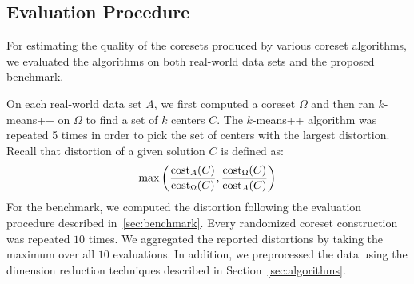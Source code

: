 \subsection{Evaluation Procedure}
For estimating the quality of the coresets produced by various coreset algorithms, we evaluated the algorithms on both real-world data sets and the proposed benchmark. 

On each real-world data set $A$, we first computed a coreset $\Omega$ and then ran $k$-means++ on $\Omega$ to find a set of $k$ centers $C$. The $k$-means++ algorithm was repeated 5 times in order to pick the set of centers with the largest distortion. Recall that distortion of a given solution $C$ is defined as:
$$
    \max\left(
      \frac{\text{cost}_A(C)}{\text{cost}_{\Omega}(C)},
      \frac{\text{cost}_{\Omega}(C)}{\text{cost}_A(C)}
    \right)
$$
For the benchmark, we computed the distortion following the evaluation procedure described in~\cref{sec:benchmark}. Every randomized coreset construction was repeated $10$ times. We aggregated the reported distortions by taking the maximum over all $10$ evaluations. 
In addition, we preprocessed the data using the dimension reduction techniques described in Section~\ref{sec:algorithms}.





